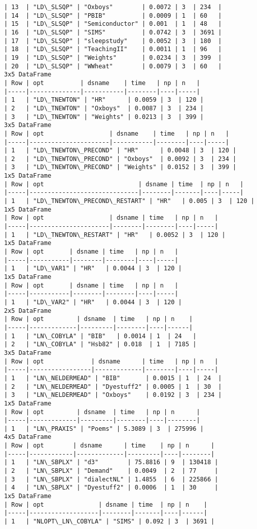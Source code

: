 \documentclass{article}
\begin{document}
\begin{Verbatim}[commandchars=\\\{\}]
| 13  | "LD\_SLSQP" | "Oxboys"        | 0.0072 | 3  | 234  |
| 14  | "LD\_SLSQP" | "PBIB"          | 0.0009 | 1  | 60   |
| 15  | "LD\_SLSQP" | "Semiconductor" | 0.001  | 1  | 48   |
| 16  | "LD\_SLSQP" | "SIMS"          | 0.0742 | 3  | 3691 |
| 17  | "LD\_SLSQP" | "sleepstudy"    | 0.0052 | 3  | 180  |
| 18  | "LD\_SLSQP" | "TeachingII"    | 0.0011 | 1  | 96   |
| 19  | "LD\_SLSQP" | "Weights"       | 0.0234 | 3  | 399  |
| 20  | "LD\_SLSQP" | "WWheat"        | 0.0079 | 3  | 60   |
3x5 DataFrame
| Row | opt          | dsname    | time   | np | n   |
|-----|--------------|-----------|--------|----|-----|
| 1   | "LD\_TNEWTON" | "HR"      | 0.0059 | 3  | 120 |
| 2   | "LD\_TNEWTON" | "Oxboys"  | 0.0087 | 3  | 234 |
| 3   | "LD\_TNEWTON" | "Weights" | 0.0213 | 3  | 399 |
3x5 DataFrame
| Row | opt                  | dsname    | time   | np | n   |
|-----|----------------------|-----------|--------|----|-----|
| 1   | "LD\_TNEWTON\_PRECOND" | "HR"      | 0.0048 | 3  | 120 |
| 2   | "LD\_TNEWTON\_PRECOND" | "Oxboys"  | 0.0092 | 3  | 234 |
| 3   | "LD\_TNEWTON\_PRECOND" | "Weights" | 0.0152 | 3  | 399 |
1x5 DataFrame
| Row | opt                          | dsname | time  | np | n   |
|-----|------------------------------|--------|-------|----|-----|
| 1   | "LD\_TNEWTON\_PRECOND\_RESTART" | "HR"   | 0.005 | 3  | 120 |
1x5 DataFrame
| Row | opt                  | dsname | time   | np | n   |
|-----|----------------------|--------|--------|----|-----|
| 1   | "LD\_TNEWTON\_RESTART" | "HR"   | 0.0052 | 3  | 120 |
1x5 DataFrame
| Row | opt       | dsname | time   | np | n   |
|-----|-----------|--------|--------|----|-----|
| 1   | "LD\_VAR1" | "HR"   | 0.0044 | 3  | 120 |
1x5 DataFrame
| Row | opt       | dsname | time   | np | n   |
|-----|-----------|--------|--------|----|-----|
| 1   | "LD\_VAR2" | "HR"   | 0.0044 | 3  | 120 |
2x5 DataFrame
| Row | opt         | dsname  | time   | np | n    |
|-----|-------------|---------|--------|----|------|
| 1   | "LN\_COBYLA" | "BIB"   | 0.0014 | 1  | 24   |
| 2   | "LN\_COBYLA" | "Hsb82" | 0.018  | 1  | 7185 |
3x5 DataFrame
| Row | opt             | dsname      | time   | np | n   |
|-----|-----------------|-------------|--------|----|-----|
| 1   | "LN\_NELDERMEAD" | "BIB"       | 0.0015 | 1  | 24  |
| 2   | "LN\_NELDERMEAD" | "Dyestuff2" | 0.0005 | 1  | 30  |
| 3   | "LN\_NELDERMEAD" | "Oxboys"    | 0.0192 | 3  | 234 |
1x5 DataFrame
| Row | opt         | dsname  | time   | np | n      |
|-----|-------------|---------|--------|----|--------|
| 1   | "LN\_PRAXIS" | "Poems" | 5.3089 | 3  | 275996 |
4x5 DataFrame
| Row | opt        | dsname      | time    | np | n      |
|-----|------------|-------------|---------|----|--------|
| 1   | "LN\_SBPLX" | "d3"        | 75.8816 | 9  | 130418 |
| 2   | "LN\_SBPLX" | "Demand"    | 0.0049  | 2  | 77     |
| 3   | "LN\_SBPLX" | "dialectNL" | 1.4855  | 6  | 225866 |
| 4   | "LN\_SBPLX" | "Dyestuff2" | 0.0006  | 1  | 30     |
1x5 DataFrame
| Row | opt               | dsname | time  | np | n    |
|-----|-------------------|--------|-------|----|------|
| 1   | "NLOPT\_LN\_COBYLA" | "SIMS" | 0.092 | 3  | 3691 |
    \end{Verbatim}


    
    
    
    
\end{document}
